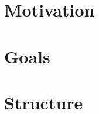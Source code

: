 
\section{Motivation}
\label{sec:motivation}

\section{Goals}
\label{sec:goals}

\section{Structure}
\label{sec:structure}

